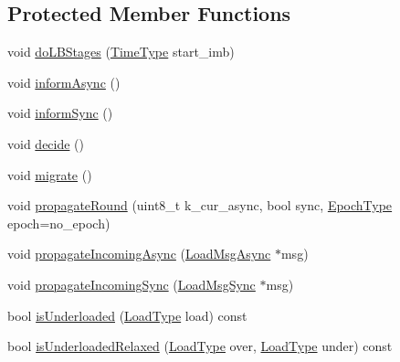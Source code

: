 \subsection*{Protected Member Functions}
\begin{DoxyCompactItemize}
\item 
void \hyperlink{structvt_1_1vrt_1_1collection_1_1lb_1_1_tempered_l_b_a164fa3ad3c312adccd059e3b64e39e8d}{do\+L\+B\+Stages} (\hyperlink{namespacevt_a876a9d0cd5a952859c72de8a46881442}{Time\+Type} start\+\_\+imb)
\item 
void \hyperlink{structvt_1_1vrt_1_1collection_1_1lb_1_1_tempered_l_b_a316b422988867cdebad99c23d23f27ce}{inform\+Async} ()
\item 
void \hyperlink{structvt_1_1vrt_1_1collection_1_1lb_1_1_tempered_l_b_af06bd756568787d47ecded79576dc145}{inform\+Sync} ()
\item 
void \hyperlink{structvt_1_1vrt_1_1collection_1_1lb_1_1_tempered_l_b_a099523e70a588de77eec53a36aeeecdf}{decide} ()
\item 
void \hyperlink{structvt_1_1vrt_1_1collection_1_1lb_1_1_tempered_l_b_a59049101eba58eb9206606c25952bd2d}{migrate} ()
\item 
void \hyperlink{structvt_1_1vrt_1_1collection_1_1lb_1_1_tempered_l_b_a2050cb21d8142439eb1c29915e25b934}{propagate\+Round} (uint8\+\_\+t k\+\_\+cur\+\_\+async, bool sync, \hyperlink{namespacevt_a81d11b28122d43bf9834577e4a06440f}{Epoch\+Type} epoch=no\+\_\+epoch)
\item 
void \hyperlink{structvt_1_1vrt_1_1collection_1_1lb_1_1_tempered_l_b_a15dd6de3c9fe1998dae4bc685c991bb5}{propagate\+Incoming\+Async} (\hyperlink{structvt_1_1vrt_1_1collection_1_1lb_1_1_tempered_l_b_a38d9ad7e92612cdbdf564b6f49b516a7}{Load\+Msg\+Async} $\ast$msg)
\item 
void \hyperlink{structvt_1_1vrt_1_1collection_1_1lb_1_1_tempered_l_b_ab754acaf5c76886c1e61ce4f4c69b1cb}{propagate\+Incoming\+Sync} (\hyperlink{structvt_1_1vrt_1_1collection_1_1lb_1_1_tempered_l_b_aa46eb8cbc4c505f35b970f75e38b5e0d}{Load\+Msg\+Sync} $\ast$msg)
\item 
bool \hyperlink{structvt_1_1vrt_1_1collection_1_1lb_1_1_tempered_l_b_a499b448496764b6eb8c25f3dc8188e2c}{is\+Underloaded} (\hyperlink{structvt_1_1vrt_1_1collection_1_1lb_1_1_base_l_b_a215e22b9f12678303f49615ae3be05cc}{Load\+Type} load) const
\item 
bool \hyperlink{structvt_1_1vrt_1_1collection_1_1lb_1_1_tempered_l_b_a9a65a386b0dbd2006db3977ecf0efe79}{is\+Underloaded\+Relaxed} (\hyperlink{structvt_1_1vrt_1_1collection_1_1lb_1_1_base_l_b_a215e22b9f12678303f49615ae3be05cc}{Load\+Type} over, \hyperlink{structvt_1_1vrt_1_1collection_1_1lb_1_1_base_l_b_a215e22b9f12678303f49615ae3be05cc}{Load\+Type} under) const

\end{DoxyCompactItemize}
